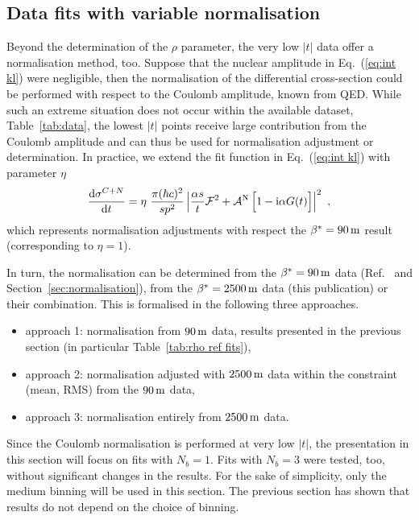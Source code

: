 \subsection{Data fits with variable normalisation}
\label{sec:rho anal norm var}

Beyond the determination of the $\rho$ parameter, the very low $|t|$ data offer a normalisation method, too. Suppose that the nuclear amplitude in Eq.~(\ref{eq:int kl}) were negligible, then the normalisation of the differential cross-section could be performed with respect to the Coulomb amplitude, known from QED. While such an extreme situation does not occur within the available dataset, Table~\ref{tab:data}, the lowest $|t|$ points receive large contribution from the Coulomb amplitude and can thus be used for normalisation adjustment or determination. In practice, we extend the fit function in Eq.~(\ref{eq:int kl}) with parameter $\eta$
\begin{equation}
\label{eq:fit fcn eta}
{\d\sigma^{C+N}\over \d t} = \eta\ {\pi (\hbar c)^2 \over s p^2} \left | {\alpha s\over t} {\cal F}^2
			+ {\cal A}^{\rm N}\, \Big[1 - \I\alpha G(t)\Big] \right |^2\ ,
\end{equation}
which represents normalisation adjustments with respect the $\beta^* = 90\,{\rm m}$ result \cite{totem-13tev-90m} (corresponding to $\eta = 1$).

In turn, the normalisation can be determined from the $\beta^* = 90\,{\rm m}$ data (Ref.~\cite{totem-13tev-90m} and Section~\ref{sec:normalisation}), from the $\beta^* = 2500\,{\rm m}$ data (this publication) or their combination. This is formalised in the following three approaches.
\begin{itemize}
\item approach 1: normalisation from $90\,{\rm m}$ data, results presented in the previous section (in particular Table~\ref{tab:rho ref fits}),
\item approach 2: normalisation adjusted with $2500\,{\rm m}$ data within the constraint (mean, RMS) from the $90\,{\rm m}$ data,
\item approach 3: normalisation entirely from $2500\,{\rm m}$ data.
\end{itemize}

Since the Coulomb normalisation is performed at very low $|t|$, the presentation in this section will focus on fits with $N_b = 1$. Fits with $N_b = 3$ were tested, too, without significant changes in the results. For the sake of simplicity, only the medium binning will be used in this section. The previous section has shown that results do not depend on the choice of binning.

